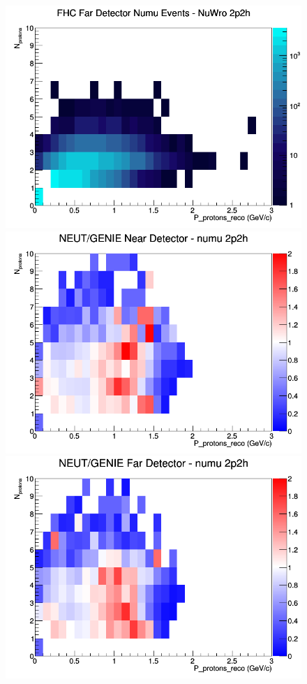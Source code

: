 \begin{figure}[h]
\endminipage
{}
\includegraphics[width=\linewidth]{eff_N_P/LAr/protons/2p2h_FHC_FD_numu_N_P_NuWro.png}
\endminipage
\newline
{}
\includegraphics[width=\linewidth]{eff_N_P/LAr/protons/ratios/2p2h_NEUT_GENIE_numu_near_N_P.png}
\endminipage
{}
\includegraphics[width=\linewidth]{eff_N_P/LAr/protons/ratios/2p2h_NEUT_GENIE_numu_far_N_P.png}

\end{figure}
